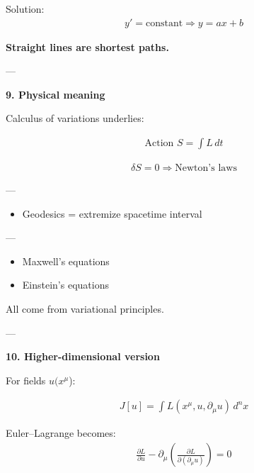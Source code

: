 \documentclass[12pt,a4paper]{report}
\begin{document}
\begin{description}
Solution:
\begin{align*}
y' = \text{constant} \Rightarrow y = ax + b
\end{align*}

\textbf{Straight lines are shortest paths.}

---

\item \textbf{9. Physical meaning}

Calculus of variations underlies:

\begin{description}
\item  {}

\begin{align*}
\text{Action } S = \int L\,dt
\end{align*}

\begin{align*}
\boxed{
\delta S = 0 \Rightarrow \text{Newton’s laws}
}
\end{align*}

---

\item  {}

\begin{itemize}
\item Geodesics = extremize spacetime interval
\end{itemize}

---

\item  {}

\begin{itemize}
\item Maxwell’s equations
\item Einstein’s equations
\end{itemize}

All come from variational principles.

\end{description}
---

\item \textbf{10. Higher-dimensional version}

For fields $u(x^\mu$):

\begin{align*}
J[u] = \int L(x^\mu, u, \partial_\mu u)\, d^n x
\end{align*}

Euler–Lagrange becomes:
\begin{align*}
\boxed{
\frac{\partial L}{\partial u} - \partial_\mu \left(\frac{\partial L}{\partial (\partial_\mu u)}\right) = 0 }
\end{align*}


\end{description}
\end{document}
